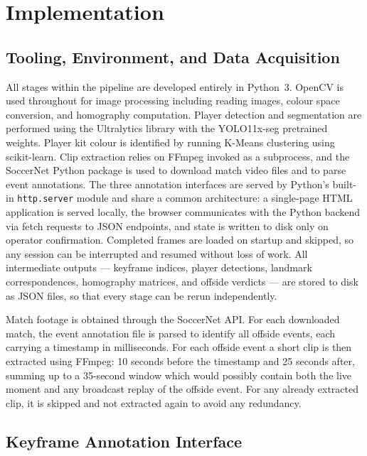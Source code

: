 \chapter{Implementation}%
\label{chp:implementation}

\section{Tooling, Environment, and Data Acquisition}%
\label{sec:impl_tooling}

All stages within the pipeline are developed entirely in Python~3. OpenCV is used throughout for image processing including reading images, colour space conversion, and homography computation. Player detection and segmentation are performed using the Ultralytics library with the YOLO11x-seg pretrained weights. Player kit colour is identified by running K-Means clustering using scikit-learn. Clip extraction relies on FFmpeg invoked as a subprocess, and the SoccerNet Python package is used to download match video files and to parse event annotations. The three annotation interfaces are served by Python's built-in \texttt{http.server} module and share a common architecture: a single-page HTML application is served locally, the browser communicates with the Python backend via fetch requests to JSON endpoints, and state is written to disk only on operator confirmation. Completed frames are loaded on startup and skipped, so any session can be interrupted and resumed without loss of work. All intermediate outputs --- keyframe indices, player detections, landmark correspondences, homography matrices, and offside verdicts --- are stored to disk as JSON files, so that every stage can be rerun independently.

Match footage is obtained through the SoccerNet API. For each downloaded match, the event annotation file is parsed to identify all offside events, each carrying a timestamp in milliseconds. For each offside event a short clip is then extracted using FFmpeg: 10 seconds before the timestamp and 25 seconds after, summing up to a 35-second window which would possibly contain both the live moment and any broadcast replay of the offside event. For any already extracted clip, it is skipped and not extracted again to avoid any redundancy.

\section{Keyframe Annotation Interface}%
\label{sec:impl_keyframe}

